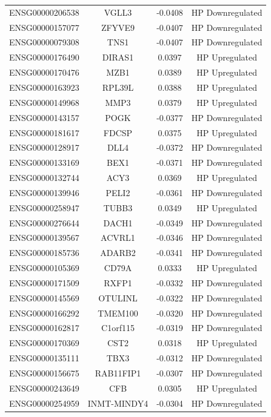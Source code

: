 \documentclass[
]{article}
\begin{document}
\begin{singlespace}
\begin{longtable}[t]{lccc}
ENSG00000206538 & VGLL3 & -0.0408 & HP Downregulated\\
ENSG00000157077 & ZFYVE9 & -0.0407 & HP Downregulated\\
\addlinespace
ENSG00000079308 & TNS1 & -0.0407 & HP Downregulated\\
ENSG00000176490 & DIRAS1 & 0.0397 & HP Upregulated\\
ENSG00000170476 & MZB1 & 0.0389 & HP Upregulated\\
ENSG00000163923 & RPL39L & 0.0388 & HP Upregulated\\
ENSG00000149968 & MMP3 & 0.0379 & HP Upregulated\\
\addlinespace
ENSG00000143157 & POGK & -0.0377 & HP Downregulated\\
ENSG00000181617 & FDCSP & 0.0375 & HP Upregulated\\
ENSG00000128917 & DLL4 & -0.0372 & HP Downregulated\\
ENSG00000133169 & BEX1 & -0.0371 & HP Downregulated\\
ENSG00000132744 & ACY3 & 0.0369 & HP Upregulated\\
\addlinespace
ENSG00000139946 & PELI2 & -0.0361 & HP Downregulated\\
ENSG00000258947 & TUBB3 & 0.0349 & HP Upregulated\\
ENSG00000276644 & DACH1 & -0.0349 & HP Downregulated\\
ENSG00000139567 & ACVRL1 & -0.0346 & HP Downregulated\\
ENSG00000185736 & ADARB2 & -0.0341 & HP Downregulated\\
\addlinespace
ENSG00000105369 & CD79A & 0.0333 & HP Upregulated\\
ENSG00000171509 & RXFP1 & -0.0332 & HP Downregulated\\
ENSG00000145569 & OTULINL & -0.0322 & HP Downregulated\\
ENSG00000166292 & TMEM100 & -0.0320 & HP Downregulated\\
ENSG00000162817 & C1orf115 & -0.0319 & HP Downregulated\\
\addlinespace
ENSG00000170369 & CST2 & 0.0318 & HP Upregulated\\
ENSG00000135111 & TBX3 & -0.0312 & HP Downregulated\\
ENSG00000156675 & RAB11FIP1 & -0.0307 & HP Downregulated\\
ENSG00000243649 & CFB & 0.0305 & HP Upregulated\\
ENSG00000254959 & INMT-MINDY4 & -0.0304 & HP Downregulated\\

\end{longtable}
\end{singlespace}
\end{document}
